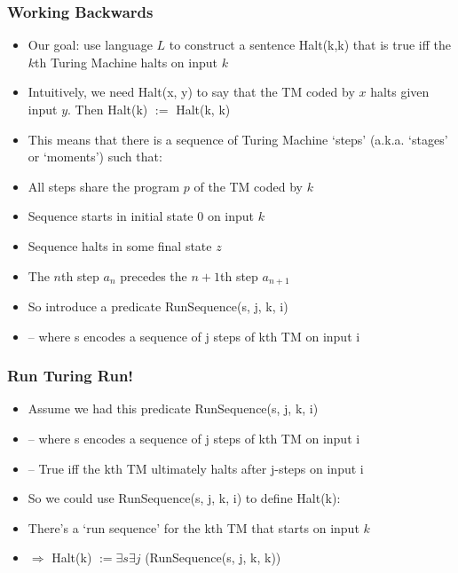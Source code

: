 \begin{frame}
\frametitle{Working Backwards}

\begin{itemize}[<+->]

\item Our goal: use language $L$ to construct a sentence \textrm{Halt(k,k)} that is true iff the $k$th Turing Machine halts on input $k$

\item Intuitively, we need \textrm{Halt(x, y)} to say that the TM coded by $x$ halts given input $y$. Then \textrm{Halt(k)} $:=$ \textrm{Halt(k, k)}

\item This means that there is a sequence of Turing Machine `steps' (a.k.a. `stages' or `moments') such that:

\bi

\item All steps share the program $p$ of the TM coded by $k$

\item Sequence starts in initial state $0$ on input $k$

\item Sequence halts in some final state $z$

\item The $n$th step $a_n$ precedes the $n+1$th step $a_{n+1}$

\ei

\item So introduce a predicate \textrm{RunSequence(s, j, k, i)}

\item[] -- where \textrm{s} encodes a sequence of \textrm{j} steps of kth TM on input \textrm{i}

\end{itemize}
\end{frame}


\begin{frame}
\frametitle{Run Turing Run!}

\begin{itemize}[<+->]

\item Assume we had this predicate \textrm{RunSequence(s, j, k, i)}

\item[] -- where \textrm{s} encodes a sequence of \textrm{j} steps of kth TM on input \textrm{i}

\item[] -- True iff the kth TM ultimately halts after j-steps on input \textrm{i}

\item So we could use \textrm{RunSequence(s, j, k, i)} to define \textrm{Halt(k)}:

\item[] There's a `run sequence' for the kth TM that starts on input $k$

\item[] $\Rightarrow$  \textrm{Halt(k)} $:= \exists s \exists j$ (\textrm{RunSequence(s, j, k, k)})

\end{itemize}
\end{frame}

